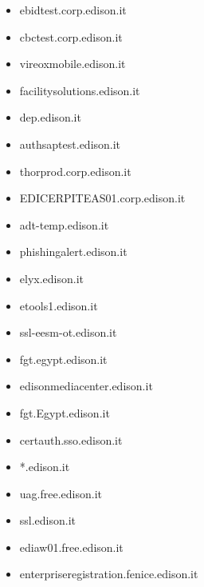 \documentclass{article}
\begin{document}
\begin{itemize}
        \item ebidtest.corp.edison.it
    
        \item cbctest.corp.edison.it
    
        \item vireoxmobile.edison.it
    
        \item facilitysolutions.edison.it
    
        \item dep.edison.it
    
        \item authsaptest.edison.it
    
        \item thorprod.corp.edison.it
    
        \item EDICERPITEAS01.corp.edison.it
    
        \item adt-temp.edison.it
    
        \item phishingalert.edison.it
    
        \item elyx.edison.it
    
        \item etools1.edison.it
    
        \item ssl-eesm-ot.edison.it
    
        \item fgt.egypt.edison.it
    
        \item edisonmediacenter.edison.it
    
        \item fgt.Egypt.edison.it
    
        \item certauth.sso.edison.it
    
        \item *.edison.it
    
        \item uag.free.edison.it
    
        \item ssl.edison.it
    
        \item ediaw01.free.edison.it
    
        \item enterpriseregistration.fenice.edison.it
    

\end{itemize}
\end{document}

